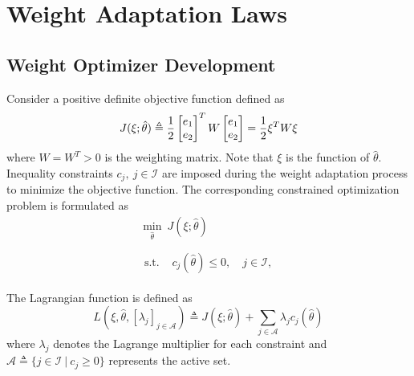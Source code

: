 \documentclass[lettersize,journal]{IEEEtran}
\begin{document}
\section{Weight Adaptation Laws}\label{sec:adap_laws}

\subsection{Weight Optimizer Development}

Consider a positive definite objective function defined as 
\begin{equation*}
    J(\xi;\hat\theta)\triangleq 
    {1\over 2}
    \begin{bmatrix}
        e_1\\e_2
    \end{bmatrix}^T
    W
    \begin{bmatrix}
        e_1\\e_2
    \end{bmatrix}
    =
    {1\over 2} \xi^T   W\xi
\end{equation*}
where $W=W^T  >0$ is the weighting matrix.
Note that $\xi$ is the function of $\hat\theta$.
Inequality constraints $c_j,\ j\in\mathcal{I}$ are imposed during the weight adaptation process to minimize the objective function. The corresponding constrained optimization problem is formulated as
\begin{equation}
    \begin{matrix}
        \min_{\hat\theta} \ J(\xi;\hat\theta)
        \\ \\
        \begin{aligned}
        \text{s.t. }&c_{j}(\hat\theta) 
        \le0, \quad j\in\mathcal{I},
        \end{aligned}
    \end{matrix}
    \label{eq. train obj}
\end{equation}

The Lagrangian function is defined as
\begin{equation*}
    L(\xi,\hat\theta,[\lambda_j]_{j\in\mathcal A}) \triangleq J(\xi;\hat\theta) + 
    \sum_{j\in\mathcal A}
    \lambda_{j}
    c_{j}(\hat\theta)
\end{equation*}
where $\lambda_j$ denotes the Lagrange multiplier for each constraint and $\mathcal A \triangleq \{j\in\mathcal I\ |\ c_j\ge 0\}$ represents the active set.
\end{document}
